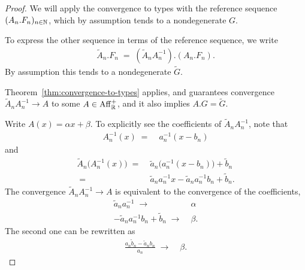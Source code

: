 \begin{proof}
  We will apply the convergence to types with the reference sequence
  $(A_n.F_n)_{n \in \mathbb{N}}$, which by assumption tends to a
  nondegenerate $G$.

  To express the other sequence in terms of the reference sequence, we write
  \begin{align*}
    \widetilde{A}_n.F_n \; = \; (\widetilde{A}_n A_n^{-1}).(A_n.F_n) .
  \end{align*}
  By assumption this tends to a nondegenerate $\widetilde{G}$.

  Theorem~\ref{thm:convergence-to-types} applies, and guarantees convergence
  $\widetilde{A}_n A_n^{-1} \to A$ to some $A \in \mathrm{Aff}^+_{\mathbb{R}}$,
  and it also implies $A.G = \widetilde{G}$.

  Write $A(x) = \alpha x + \beta$. To explicitly see the coefficients of
  $\widetilde{A}_n A_n^{-1}$, note that
  \begin{align*}
    A_n^{-1}(x) \; = \; & a_n^{-1} (x - b_n)
  \end{align*}
  and
  \begin{align*}
    \widetilde{A}_n \big( A_n^{-1}(x) \big)
    \; = \; & \tilde{a}_n \big(a_n^{-1} (x - b_n)\big) + \tilde{b}_n \\
    \; = \; & \tilde{a}_n a_n^{-1} x - \tilde{a}_n a_n^{-1} b_n + \tilde{b}_n .
  \end{align*}
  The convergence $\widetilde{A}_n A_n^{-1} \to A$ is equivalent to
  the convergence of the coefficients,
  \begin{align*}
    \tilde{a}_n a_n^{-1} \; \longrightarrow \; & \alpha \\
    - \tilde{a}_n a_n^{-1} b_n + \tilde{b}_n \; \longrightarrow \; & \beta .
  \end{align*}
  The second one can be rewritten as
  \begin{align*}
    \frac{a_n \tilde{b}_n - \tilde{a}_n b_n}{a_n} \; \longrightarrow \; & \beta .
  \end{align*}
\end{proof}

